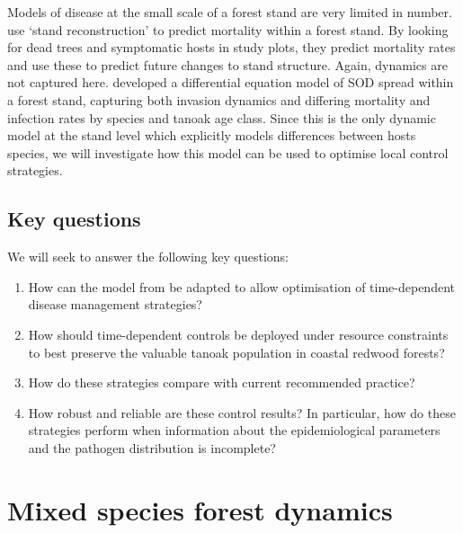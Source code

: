 Models of disease at the small scale of a forest stand are very limited in number. \citet{brown_forest_2009} use `stand reconstruction' to predict mortality within a forest stand. By looking for dead trees and symptomatic hosts in study plots, they predict mortality rates and use these to predict future changes to stand structure. Again, dynamics are not captured here. \citet{cobb_ecosystem_2012} developed a differential equation model of SOD spread within a forest stand, capturing both invasion dynamics and differing mortality and infection rates by species and tanoak age class. Since this is the only dynamic model at the stand level which explicitly models differences between hosts species, we will investigate how this model can be used to optimise local control strategies.

\subsection{Key questions}

We will seek to answer the following key questions:
\begin{enumerate}
    \item How can the model from \citet{cobb_ecosystem_2012} be adapted to allow optimisation of time-dependent disease management strategies?
    \item How should time-dependent controls be deployed under resource constraints to best preserve the valuable tanoak population in coastal redwood forests?
    \item How do these strategies compare with current recommended practice?
    \item How robust and reliable are these control results? In particular, how do these strategies perform when information about the epidemiological parameters and the pathogen distribution is incomplete?
\end{enumerate}

\newpage
{}\label{sec:ch5:CobbModel}
\section{Mixed species forest dynamics}

